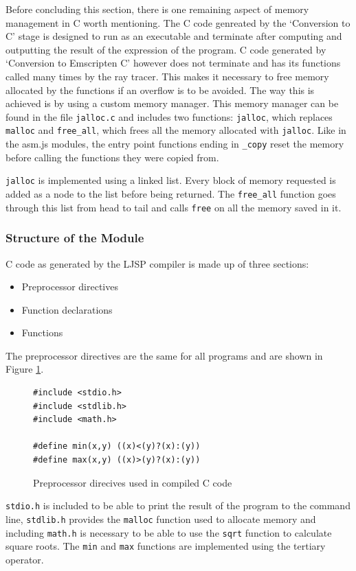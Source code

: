 \documentclass[11pt]{report}
\begin{document}
Before concluding this section, there is one remaining aspect of memory management in C worth mentioning. The C code genreated by the `Conversion to C' stage is designed to run as an executable and terminate after computing and outputting the result of the expression of the program. C code generated by `Conversion to Emscripten C' however does not terminate and has its functions called many times by the ray tracer. This makes it necessary to free memory allocated by the functions if an overflow is to be avoided. The way this is achieved is by using a custom memory manager. This memory manager can be found in the file \texttt{jalloc.c} and includes two functions: \texttt{jalloc}, which replaces \texttt{malloc} and \texttt{free_all}, which frees all the memory allocated with \texttt{jalloc}. Like in the asm.js modules, the entry point functions ending in \texttt{_copy} reset the memory before calling the functions they were copied from.

\texttt{jalloc} is implemented using a linked list. Every block of memory requested is added as a node to the list before being returned. The \texttt{free_all} function goes through this list from head to tail and calls \texttt{free} on all the memory saved in it.

\subsubsection{Structure of the Module}
C code as generated by the LJSP compiler is made up of three sections:
\begin{itemize}
\item Preprocessor directives
\item Function declarations
\item Functions
\end{itemize}

The preprocessor directives are the same for all programs and are shown in Figure \ref{icmm4}.

\begin{figure}[ht]
\begin{lstlisting}
#include <stdio.h>
#include <stdlib.h>
#include <math.h>
    
#define min(x,y) ((x)<(y)?(x):(y))
#define max(x,y) ((x)>(y)?(x):(y))
\end{lstlisting}
\caption{Preprocessor direcives used in compiled C code}
\label{icmm4}
\end{figure}

\texttt{stdio.h} is included to be able to print the result of the program to the command line, \texttt{stdlib.h} provides the \texttt{malloc} function used to allocate memory and including \texttt{math.h} is necessary to be able to use the \texttt{sqrt} function to calculate square roots. The \texttt{min} and \texttt{max} functions are implemented using the tertiary operator.
\end{document}
